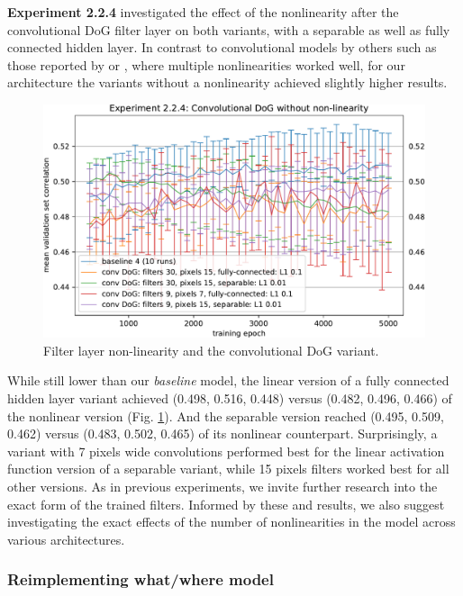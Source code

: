 \textbf{Experiment 2.2.4} investigated the effect of the nonlinearity after the convolutional DoG filter layer on both variants, with a separable as well as fully connected hidden layer. In contrast to convolutional models by others such as those reported by \cite{klindt} or \cite{ecker}, where multiple nonlinearities worked well, for our architecture the variants without a nonlinearity achieved slightly higher results.

\begin{figure}[H]
    \centering
    \includegraphics[width=1\textwidth]{../figures/05_2_2_4}
    \caption[Experiment 2.2.4]{Filter layer non-linearity and the convolutional DoG variant.}
    \label{fig:5.2.2.4}
\end{figure}

While still lower than our \textit{baseline} model, the linear version of a fully connected hidden layer variant achieved (0.498, 0.516, 0.448) versus (0.482, 0.496, 0.466) of the nonlinear version (Fig. \ref{fig:5.2.2.4}). And the separable version reached (0.495, 0.509, 0.462) versus (0.483, 0.502, 0.465) of its nonlinear counterpart. Surprisingly, a variant with 7 pixels wide convolutions performed best for the linear activation function version of a separable variant, while 15 pixels filters worked best for all other versions. As in previous experiments, we invite further research into the exact form of the trained filters. Informed by these and  results, we also suggest investigating the exact effects of the number of nonlinearities in the model across various architectures.

\subsubsection{Reimplementing what/where model}

